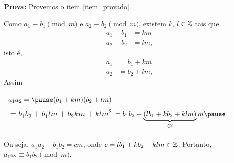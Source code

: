 \documentclass{beamer}
\begin{document}
    \begin{frame}
        \noindent\textbf{Prova: }
            Provemos o item \ref{item_provado}.\pause

            Como $a_{1}\equiv b_{1}\pmod{m}$ \pause e $a_{2}\equiv b_{2}\pmod{m}$, \pause existem $k$, $l \in \mathbb{Z}$ tais que\pause
            \begin{align*}
                a_1 - b_1 &= km\\
                a_2 - b_2 &= lm,
            \end{align*}\pause
            isto \'e,
            \begin{align*}
                a_1 &= b_1 + km\\
                a_2 &= b_2 + lm,
            \end{align*}\pause
            Assim
            \begin{center}
                \begin{tabular}{l}
                    $a_1a_2 = \pause (b_1 + km)(b_2 + lm)$ \\ \pause $= b_1b_2 + b_1lm + b_2km + klm^2 $ \pause $= b_1b_2 + \underbrace{(lb_{1}+kb_{2}+klm)}_{\in \z}m\pause$
                \end{tabular}
            \end{center}\pause

            Ou seja, $a_1a_2 - b_1b_2 = cm$, \pause onde $c = lb_1 + kb_2 + klm \in \mathbb{Z}$. \pause Portanto, $a_1a_2 \equiv b_1b_2 \pmod{m}$.\hspace{.5cm} \qedsymbol\pause
    \end{frame}
\end{document}
